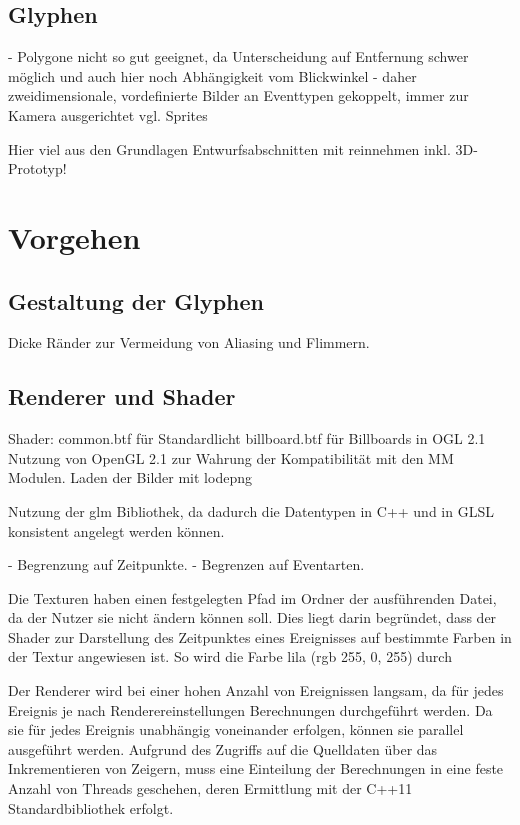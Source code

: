\subsection{Glyphen}
- Polygone nicht so gut geeignet, da Unterscheidung auf Entfernung schwer möglich und auch hier noch Abhängigkeit vom Blickwinkel
- daher zweidimensionale, vordefinierte Bilder an Eventtypen gekoppelt, immer zur Kamera ausgerichtet vgl. Sprites

Hier viel aus den Grundlagen Entwurfsabschnitten mit reinnehmen inkl. 3D-Prototyp!

\section{Vorgehen}
\subsection{Gestaltung der Glyphen}

Dicke Ränder zur Vermeidung von Aliasing und Flimmern.

\subsection{Renderer und Shader}
Shader:
common.btf für Standardlicht
billboard.btf für Billboards in OGL 2.1
Nutzung von OpenGL 2.1 zur Wahrung der Kompatibilität mit den MM Modulen.
Laden der Bilder mit lodepng

Nutzung der glm Bibliothek, da dadurch die Datentypen in C++ und in GLSL konsistent angelegt werden können.

- Begrenzung auf Zeitpunkte.
- Begrenzen auf Eventarten.

Die Texturen haben einen festgelegten Pfad im Ordner der ausführenden Datei, da der Nutzer sie nicht ändern können soll. Dies liegt darin begründet, dass der Shader zur Darstellung des Zeitpunktes eines Ereignisses auf bestimmte Farben in der Textur angewiesen ist. So wird die Farbe lila (rgb 255, 0, 255) durch 

Der Renderer wird bei einer hohen Anzahl von Ereignissen langsam, da für jedes Ereignis je nach Renderereinstellungen Berechnungen durchgeführt werden. Da sie für jedes Ereignis unabhängig voneinander erfolgen, können sie parallel ausgeführt werden. Aufgrund des Zugriffs auf die Quelldaten über das Inkrementieren von Zeigern, muss eine Einteilung der Berechnungen in eine feste Anzahl von Threads geschehen, deren Ermittlung mit der C++11 Standardbibliothek  erfolgt. 


